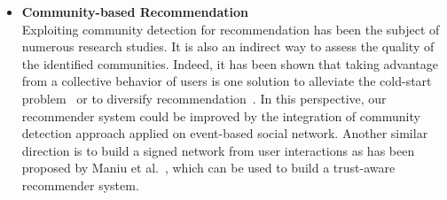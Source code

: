 \begin{itemize}
\item \textbf{Community-based Recommendation}
\vspace{1mm}
\\Exploiting community detection for recommendation has been the subject of numerous research studies. It is also an indirect way to assess the quality of the identified communities. Indeed, it has been shown that taking advantage from a collective behavior of users is one solution to alleviate the cold-start problem~\cite{Shaghayegh:RSWEB11,Bessa:AMW12} or to diversify recommendation~\cite{Fatemi:ICSC13}. In this perspective, our recommender system could be improved by the integration of community detection approach applied on event-based social network. Another similar direction is to build a signed network from user interactions as has been proposed by Maniu et al.~\cite{Maniu:2011}, which can be used to build a trust-aware recommender system.

\end{itemize}
